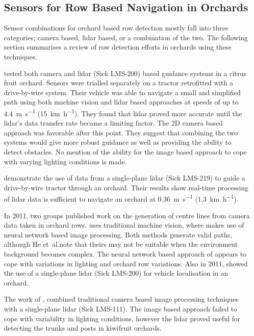 \documentclass[preprint,authoryear,12pt]{elsarticle}
\begin{document}
    \subsection{Sensors for Row Based Navigation in Orchards}

        Sensor combinations for orchard based row detection mostly fall into three categories; camera based, lidar based, or a combination of the two.
        The following section summarises a review of row detection efforts in orchards using these techniques.

        \cite{Subramanian2006} tested both camera and lidar (Sick LMS-200) based guidance systems in a citrus fruit orchard.
        Sensors were trialled separately on a tractor retrofitted with a drive-by-wire system.
        Their vehicle was able to navigate a small and simplified path using both machine vision and lidar based approaches at speeds of up to \SI{4.4}{\meter\per\second} (\SI{15}{\kilo\meter\per\hour}).
        They found that lidar proved more accurate until the lidar's data transfer rate became a limiting factor.
        The 2D camera based approach was favorable after this point.
        They suggest that combining the two systems would give more robust guidance as well as providing the ability to detect obstacles.
        No mention of the ability for the image based approach to cope with varying lighting conditions is made.

        \cite{Barawid2007} demonstrate the use of data from a single-plane lidar (Sick LMS-219) to guide a drive-by-wire tractor through an orchard.
        Their results show real-time processing of lidar data is sufficient to navigate an orchard at \SI{0.36}{\meter\per\second} (\SI{1.3}{\kilo\meter\per\hour}).


        In 2011, two groups published work on the generation of centre lines from camera data taken in orchard rows.
        \cite{He2011} uses traditional machine vision, where \cite{Torres2011} makes use of neural network based image processing.
        Both methods generate valid paths, although He et~al.\@ note that theirs may not be suitable when the environment background becomes complex.
        The neural network based approach of \cite{Torres2011} appears to cope with variations in lighting and orchard row variations.
        Also in 2011, \cite{Hansen2011} showed the use of a single-plane lidar (Sick LMS-200) for vehicle localisation in an orchard.

        The work of \cite{Scarfe2012}, combined traditional camera based image processing techniques with a single-plane lidar (Sick LMS-111).
        The image based approach failed to cope with variability in lighting conditions, however the lidar proved useful for detecting the trunks and posts in kiwifruit orchards.
\end{document}

